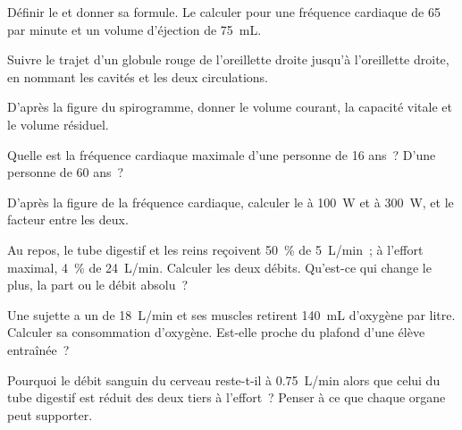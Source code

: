 \begin{exercise}[$\star$]\label{exo:g10:heart-lungs-effort:2}
Définir le  et donner sa formule. Le calculer pour une
fréquence cardiaque de 65 par minute et un volume d'éjection de
\qty{75}{mL}.
\end{exercise}

\begin{exercise}[$\star$]\label{exo:g10:heart-lungs-effort:3}
Suivre le trajet d'un globule rouge de l'oreillette droite jusqu'à
l'oreillette droite, en nommant les cavités et les deux circulations.
\end{exercise}

\begin{exercise}[$\star$]\label{exo:g10:heart-lungs-effort:4}
D'après la figure du spirogramme, donner le volume courant, la capacité
vitale et le volume résiduel.
\end{exercise}

\begin{exercise}[$\star$]\label{exo:g10:heart-lungs-effort:5}
Quelle est la fréquence cardiaque maximale d'une personne de 16 ans~?
D'une personne de 60 ans~?
\end{exercise}

\begin{exercise}[$\star\star$]\label{exo:g10:heart-lungs-effort:6}
D'après la figure de la fréquence cardiaque, calculer le  à \qty{100}{W} et à \qty{300}{W}, et le facteur entre les
deux.
\end{exercise}

\begin{exercise}[$\star\star$]\label{exo:g10:heart-lungs-effort:7}
Au repos, le tube digestif et les reins reçoivent 50~\% de
\qty{5}{L/min}~; à l'effort maximal, 4~\% de \qty{24}{L/min}. Calculer
les deux débits. Qu'est-ce qui change le plus, la part ou le débit
absolu~?
\end{exercise}

\begin{exercise}[$\star\star$]\label{exo:g10:heart-lungs-effort:8}
Une sujette a un  de \qty{18}{L/min} et ses muscles
retirent \qty{140}{mL} d'oxygène par litre. Calculer sa consommation
d'oxygène. Est-elle proche du plafond d'une élève entraînée~?
\end{exercise}

\begin{exercise}[$\star\star$]\label{exo:g10:heart-lungs-effort:9}
Pourquoi le débit sanguin du cerveau reste-t-il à \qty{0.75}{L/min}
alors que celui du tube digestif est réduit des deux tiers à l'effort~?
Penser à ce que chaque organe peut supporter.
\end{exercise}

